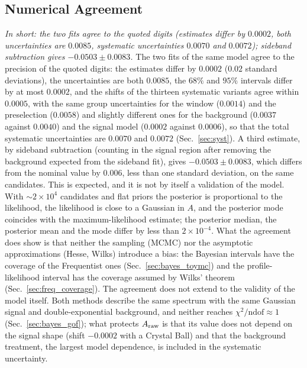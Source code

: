 \subsection{Numerical Agreement}
\label{sec:comparison_numbers}
\emph{In short: the two fits agree to the quoted digits (estimates differ by $0.0002$, both uncertainties are $0.0085$, systematic uncertainties $0.0070$ and $0.0072$); sideband subtraction gives $-0.0503\pm0.0083$.}
The two fits of the same model agree to the precision of the quoted digits: the estimates differ by $0.0002$ ($0.02$ standard deviations), the uncertainties are both $0.0085$, the $68\%$ and $95\%$ intervals differ by at most $0.0002$, and the shifts of the thirteen systematic variants agree within $0.0005$, with the same group uncertainties for the window ($0.0014$) and the preselection ($0.0058$) and slightly different ones for the background ($0.0037$ against $0.0040$) and the signal model ($0.0002$ against $0.0006$), so that the total systematic uncertainties are $0.0070$ and $0.0072$ (Sec.~\ref{sec:syst}). A third estimate, by sideband subtraction (counting in the signal region after removing the background expected from the sideband fit), gives $-0.0503\pm0.0083$, which differs from the nominal value by $0.006$, less than one standard deviation, on the same candidates. This is expected, and it is not by itself a validation of the model. With $\sim2\times10^4$ candidates and flat priors the posterior is proportional to the likelihood, the likelihood is close to a Gaussian in $A$, and the posterior mode coincides with the maximum-likelihood estimate; the posterior median, the posterior mean and the mode differ by less than $2\times10^{-4}$. What the agreement does show is that neither the sampling (MCMC) nor the asymptotic approximations (Hesse, Wilks) introduce a bias: the Bayesian intervals have the coverage of the Frequentist ones (Sec.~\ref{sec:bayes_toymc}) and the profile-likelihood interval has the coverage assumed by Wilks' theorem (Sec.~\ref{sec:freq_coverage}).
The agreement does not extend to the validity of the model itself. Both methods describe the same spectrum with the same Gaussian signal and double-exponential background, and neither reaches $\chi^2/\mathrm{ndof}\approx1$ (Sec.~\ref{sec:bayes_gof}); what protects $A_{\mathrm{raw}}$ is that its value does not depend on the signal shape (shift $-0.0002$ with a Crystal Ball) and that the background treatment, the largest model dependence, is included in the systematic uncertainty.

